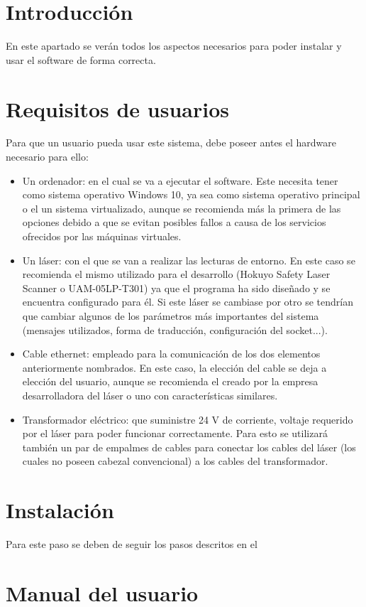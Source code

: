 
\section{Introducción}
En este apartado se verán todos los aspectos necesarios para poder instalar y usar el software de forma correcta.

\section{Requisitos de usuarios}
Para que un usuario pueda usar este sistema, debe poseer antes el hardware necesario para ello:
\begin{itemize}
	\item Un ordenador: en el cual se va a ejecutar el software. Este necesita tener como sistema operativo Windows 10, ya sea como sistema operativo principal o el un sistema virtualizado, aunque se recomienda más la primera de las opciones debido a que se evitan posibles fallos a causa de los servicios ofrecidos por las máquinas virtuales.
	\item Un láser: con el que se van a realizar las lecturas de entorno. En este caso se recomienda el mismo utilizado para el desarrollo (Hokuyo Safety Laser Scanner  o UAM-05LP-T301) ya que el programa ha sido diseñado y se encuentra configurado para él. Si este láser se cambiase por otro se tendrían que cambiar algunos de los parámetros más importantes del sistema (mensajes utilizados, forma de traducción, configuración del socket...).
	\item Cable ethernet: empleado para la comunicación de los dos elementos anteriormente nombrados. En este caso, la elección del cable se deja a elección del usuario, aunque se recomienda el creado por la empresa desarrolladora del láser o uno con características similares.
	\item Transformador eléctrico: que suministre 24 V de corriente, voltaje requerido por el láser para poder funcionar correctamente. Para esto se utilizará también un par de empalmes de cables para conectar los cables del láser (los cuales no poseen cabezal convencional) a los cables del transformador.
\end{itemize}
\section{Instalación}
Para este paso se deben de seguir los pasos descritos en el 
\section{Manual del usuario}



